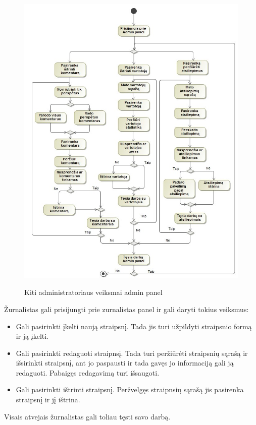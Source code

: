 ﻿\documentclass{VUMIFPSkursinis}
\begin{document}
\begin{figure}[H]
	\centering
    \includegraphics[scale=0.5]{img/Pav/AdminFunkOthers}
	\label{uml:27}
	\caption{Kiti administratoriaus veiksmai admin panel}
\end{figure}

Žurnalistas gali prisijungti prie zurnalistas panel ir gali daryti tokius veiksmus:
\begin{itemize}
\item Gali pasirinkti įkelti naują straipsnį. Tada jis turi užpildyti straipsnio formą ir ją įkelti.
\item Gali pasirinkti redaguoti straipnsį. Tada turi peržiūrėti straipsnių sąrašą ir išsirinkti straipsnį, ant jo paspausti ir tada gavęs jo informaciją gali ją redaguoti. Pabaigęs redagavimą turi išsaugoti.
\item Gali pasirinkti ištrinti straipsnį. Peržvelgęs straipnsių sąrašą jis pasirenka straipsnį ir jį ištrina.
\end{itemize}
Visais atvejais žurnalistas gali toliau tęsti savo darbą.
\end{document}
